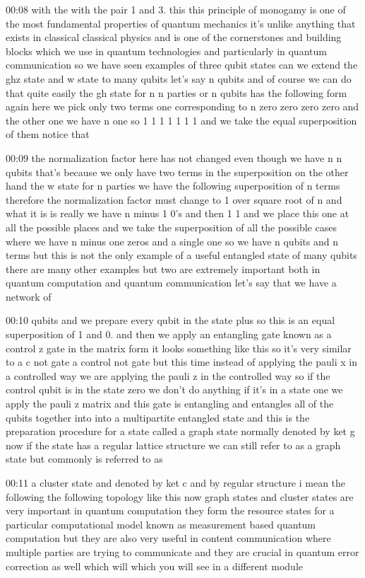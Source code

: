 00:08
with the with the pair 1 and 3. this this principle of monogamy is one
of the most fundamental properties of quantum mechanics
it's unlike anything that exists in classical
classical physics and is one of the cornerstones and building blocks
which we use in quantum technologies and particularly in quantum communication
so we have seen examples of three qubit states can we extend the ghz state and w
state to many qubits let's say n qubits and of course
we can do that quite easily the gh state for n n parties or n qubits has the
following form again here we pick only two terms
one corresponding to n zero zero zero zero and the other one we have
n one so 1 1 1 1 1 1 1 and we take the equal superposition of them notice that

00:09
the normalization factor here has not changed even though we have n
n qubits that's because we only have two terms in the superposition
on the other hand the w state for n parties we have the following superposition
of n terms therefore the normalization factor must change to 1
over square root of n and what it is is really we have n
minus 1 0's and then 1 1 and we place this one at all the possible places
and we take the superposition of all the
possible cases where we have n minus one zeros and
a single one so we have n qubits and n terms
but this is not the only example of a useful entangled state of many qubits
there are many other examples but two are extremely important both in quantum
computation and quantum communication let's say that we have a network of

00:10
qubits and we prepare every qubit in the state plus so this is
an equal superposition of 1 and 0. and then we apply an
entangling gate known as a control z gate in the matrix form it looks
something like this so it's very similar to a c not gate a control not gate
but this time instead of applying the pauli x
in a controlled way we are applying the pauli z in the controlled way
so if the control qubit is in the state zero we don't do anything
if it's in a state one we apply the pauli z matrix
and this gate is entangling and entangles all of the qubits together into into a
multipartite entangled state and this is the preparation procedure
for a state called a graph state normally denoted by ket
g now if the state has a regular lattice structure
we can still refer to as a graph state but commonly is referred to as

00:11
a cluster state and denoted by ket c and by regular structure i mean
the following the following topology like this
now graph states and cluster states are very important in quantum computation
they form the resource states for a particular
computational model known as measurement based quantum computation
but they are also very useful in content communication where
multiple parties are trying to communicate and they are crucial in quantum
error correction as well which will which you will see in a different module

